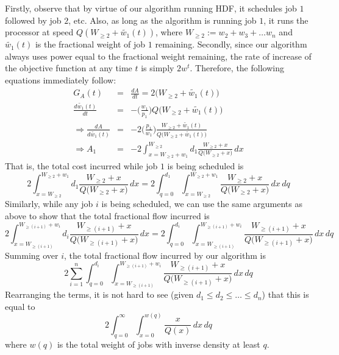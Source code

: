 \documentclass[11pt]{article}
\begin{document}
Firstly, observe that by virtue of our algorithm running HDF, it schedules job $1$ followed by job $2$, etc.
Also, as long as the algorithm is running job $1$, it runs the processor at speed
$Q(W_{\geq 2} + \widetilde{w_1}(t))$, where $W_{\geq 2} := w_2 + w_3 + \ldots w_n$ and $\widetilde{w_1}(t)$ is
the fractional weight of job $1$ remaining.
Secondly, since our algorithm always uses power equal to the fractional weight remaining, the rate of increase of the objective function at any time $t$ is simply $2 w^t$.
Therefore, the following equations immediately follow:
\begin{eqnarray}
\nonumber G_A(t) &=& \frac{dA}{dt} = 2\big(W_{\geq 2} + \widetilde{w_1}(t)\big) \\
\nonumber \frac{ d \widetilde{w_1}(t)}{dt} &=& -\bigg( \frac{w_1}{p_1}\bigg) Q\bigg( W_{\geq 2} + \widetilde{w_1}(t) \bigg) \\
\nonumber \Rightarrow \frac{dA}{ d \widetilde{w_1}(t)} &=& - 2 \bigg( \frac{p_1}{w_1} \bigg) \frac{W_{\geq 2} + \widetilde{w_1}(t)}{Q\big( W_{\geq 2} + \widetilde{w_1}(t) \big)} \\
\nonumber \Rightarrow A_1 &=&  - 2 \int_{x = W_{\geq 2} + w_1}^{W_{\geq 2}} d_1 \frac{W_{\geq 2} + x}{Q\big( W_{\geq 2} + x \big)} \,dx
\end{eqnarray}
That is, the total cost incurred while job $1$ is being scheduled is
$$
 2 \int_{x = W_{\geq 2}}^{W_{\geq 2} + w_1} d_1 \frac{W_{\geq 2} + x}{Q\big( W_{\geq 2} + x \big)} \,dx = 2 \int_{q = 0}^{d_1} \int_{x = W_{\geq 2}}^{W_{\geq 2} + w_1} \frac{W_{\geq 2} + x}{Q\big( W_{\geq 2} + x \big)} \,dx \,dq
 $$
Similarly, while any job $i$ is being scheduled, we can use the same arguments as above to show that the total fractional flow incurred is
 $$
 2 \int_{x = W_{\geq (i+1)}}^{W_{\geq (i+1)} + w_i} d_i \frac{W_{\geq (i+1)} + x}{Q\big( W_{\geq (i+1)} + x \big)} \,dx = 2 \int_{q = 0}^{d_i} \int_{x = W_{\geq (i+1)}}^{W_{\geq (i+1)} + w_i} \frac{W_{\geq (i+1)} + x}{Q\big( W_{\geq (i+1)} + x \big)} \,dx \,dq
 $$
 Summing over $i$, the total fractional flow incurred by our algorithm
 is
 $$
2 \sum_{i =1}^{n} \int_{q = 0}^{d_i} \int_{x = W_{\geq (i+1)}}^{W_{\geq (i+1)} + w_i} \frac{W_{\geq (i+1)} + x}{Q\big( W_{\geq (i+1)} + x \big)} \,dx \,dq
 $$
Rearranging the terms, it is not hard to see (given $d_1 \leq d_2 \leq \ldots \leq d_n$) that this is equal to
$$
2 \int_{q = 0}^{\infty} \int_{x = 0}^{w(q)} \frac{x}{Q(x)} \,dx \,dq
$$
where $w(q)$ is the total weight of jobs with inverse density at least $q$.
\end{document}
